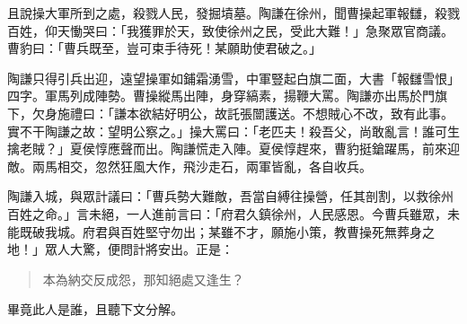 且說操大軍所到之處，殺戮人民，發掘墳墓。陶謙在徐州，聞曹操起軍報讎，殺戮百姓，仰天慟哭曰：「我獲罪於天，致使徐州之民，受此大難！」急聚眾官商議。曹豹曰：「曹兵既至，豈可束手待死！某願助使君破之。」

陶謙只得引兵出迎，遠望操軍如鋪霜湧雪，中軍豎起白旗二面，大書「報讎雪恨」四字。軍馬列成陣勢。曹操縱馬出陣，身穿縞素，揚鞭大罵。陶謙亦出馬於門旗下，欠身施禮曰：「謙本欲結好明公，故託張闓護送。不想賊心不改，致有此事。實不干陶謙之故：望明公察之。」操大罵曰：「老匹夫！殺吾父，尚敢亂言！誰可生擒老賊？」夏侯惇應聲而出。陶謙慌走入陣。夏侯惇趕來，曹豹挺鎗躍馬，前來迎敵。兩馬相交，忽然狂風大作，飛沙走石，兩軍皆亂，各自收兵。

陶謙入城，與眾計議曰：「曹兵勢大難敵，吾當自縛往操營，任其剖割，以救徐州百姓之命。」言未絕，一人進前言曰：「府君久鎮徐州，人民感恩。今曹兵雖眾，未能既破我城。府君與百姓堅守勿出；某雖不才，願施小策，教曹操死無葬身之地！」眾人大驚，便問計將安出。正是：

\begin{quote}
本為納交反成怨，那知絕處又逢生？
\end{quote}

畢竟此人是誰，且聽下文分解。

